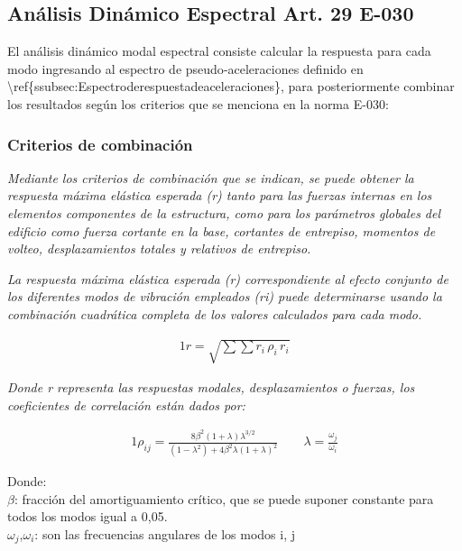 \documentclass{article}%
\begin{document}
%
\subsection{Análisis Dinámico Espectral Art. 29 E{-}030}%
\label{subsec:AnlisisDinmicoEspectralArt.29E{-}030}%
El análisis dinámico modal espectral consiste calcular la respuesta para cada modo ingresando al espectro de pseudo{-}aceleraciones definido en \textbackslash{}ref\{ssubsec:Espectroderespuestadeaceleraciones\}, para posteriormente combinar los resultados según los criterios que se menciona en la norma E{-}030:%

%
\subsubsection{Criterios de combinación}%
\label{ssubsec:Criteriosdecombinacin}%
\begin{tcolorbox}[colback=gray!5!white,colframe=Maroon!75!black,fonttitle=\bfseries,title=Art. 29.3.1]%
\textit{Mediante los criterios de combinación que se indican, se puede obtener la respuesta máxima elástica esperada (r) tanto para las fuerzas internas en los elementos componentes de la estructura, como para los parámetros globales  del edificio como fuerza cortante en la base, cortantes de entrepiso, momentos  de volteo, desplazamientos totales y relativos de entrepiso.}%
\end{tcolorbox}%
\begin{tcolorbox}[colback=gray!5!white,colframe=Maroon!75!black,fonttitle=\bfseries,title=Art. 29.3.2]%
\textit{La respuesta máxima elástica esperada (r) correspondiente al efecto conjunto  de  los  diferentes  modos  de  vibración  empleados  (ri)  puede determinarse usando la combinación cuadrática completa de los valores calculados para cada modo.}%
\end{tcolorbox}%
\begin{alignat}{1}%
r=\sqrt{\sum \sum r_{i}\,\rho _{i}\,r_{i}}%
\end{alignat}%
\begin{tcolorbox}[colback=gray!5!white,colframe=Maroon!75!black,fonttitle=\bfseries,title=Art. 29.3.3]%
\textit{Donde r representa las respuestas modales, desplazamientos o fuerzas, los coeficientes de correlación están dados por:}%
\end{tcolorbox}%
\begin{alignat}{1}%
\rho_{ij}=\frac{8\beta ^{2}\left ( 1+\lambda  \right )\lambda ^{3/2}}{\left ( 1-\lambda ^{2} \right )+4\beta ^{2}\lambda \left ( 1+\lambda  \right )^{2}}\quad\quad  \lambda =\frac{\omega _{j}}{\omega _{i}}%
\end{alignat}%
\begin{flushleft}%
Donde:\\%
$\beta$: fracción del amortiguamiento crítico, que se puede suponer constante para todos los modos igual a 0,05.\\%
$\omega _{j}$,$\omega _{i}$: son las frecuencias angulares de los modos i, j\\%
\end{flushleft}
\end{document}

